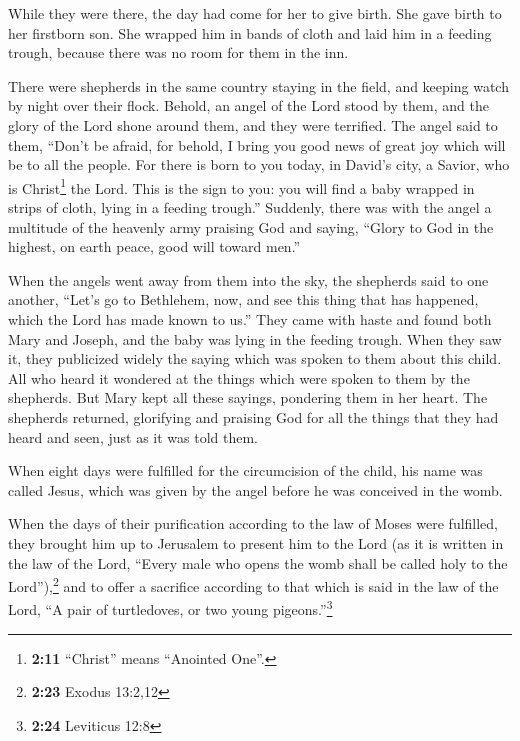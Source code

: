  While they were there, the day had come for her to give
birth.  She gave birth to her firstborn son. She wrapped
him in bands of cloth and laid him in a feeding trough, because there
was no room for them in the inn.

 There were shepherds in the same country staying in the
field, and keeping watch by night over their flock. 
Behold, an angel of the Lord stood by them, and the glory of the Lord
shone around them, and they were terrified.  The angel
said to them, ``Don't be afraid, for behold, I bring you good news of
great joy which will be to all the people.  For there is
born to you today, in David's city, a Savior, who is Christ\footnote{\textbf{2:11}
  ``Christ'' means ``Anointed One''.} the Lord.  This is
the sign to you: you will find a baby wrapped in strips of cloth, lying
in a feeding trough.''  Suddenly, there was with the
angel a multitude of the heavenly army praising God and saying,
 ``Glory to God in the highest, on earth peace, good will
toward men.''

 When the angels went away from them into the sky, the
shepherds said to one another, ``Let's go to Bethlehem, now, and see
this thing that has happened, which the Lord has made known to us.''
 They came with haste and found both Mary and Joseph, and
the baby was lying in the feeding trough.  When they saw
it, they publicized widely the saying which was spoken to them about
this child.  All who heard it wondered at the things
which were spoken to them by the shepherds.  But Mary
kept all these sayings, pondering them in her heart.  The
shepherds returned, glorifying and praising God for all the things that
they had heard and seen, just as it was told them.

 When eight days were fulfilled for the circumcision of
the child, his name was called Jesus, which was given by the angel
before he was conceived in the womb.

 When the days of their purification according to the law
of Moses were fulfilled, they brought him up to Jerusalem to present him
to the Lord  (as it is written in the law of the Lord,
``Every male who opens the womb shall be called holy to the
Lord''),\footnote{\textbf{2:23} Exodus 13:2,12}  and to
offer a sacrifice according to that which is said in the law of the
Lord, ``A pair of turtledoves, or two young pigeons.''\footnote{\textbf{2:24}
  Leviticus 12:8}

